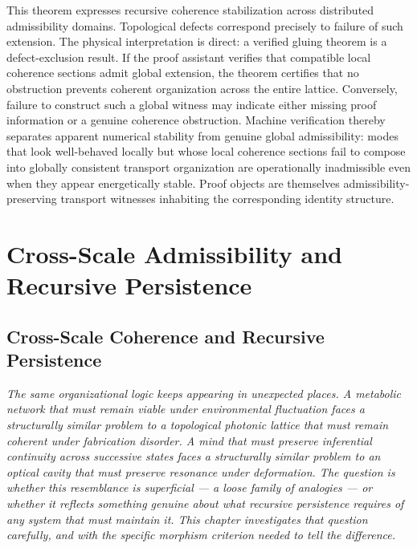\documentclass[11pt,openany]{book}
\theoremstyle{definition}
\theoremstyle{plain}
\begin{document}
This theorem expresses recursive coherence stabilization across distributed admissibility domains. Topological defects correspond precisely to failure of such extension. The physical interpretation is direct: a verified gluing theorem is a defect-exclusion result. If the proof assistant verifies that compatible local coherence sections admit global extension, the theorem certifies that no obstruction prevents coherent organization across the entire lattice. Conversely, failure to construct such a global witness may indicate either missing proof information or a genuine coherence obstruction. Machine verification thereby separates apparent numerical stability from genuine global admissibility: modes that look well-behaved locally but whose local coherence sections fail to compose into globally consistent transport organization are operationally inadmissible even when they appear energetically stable. Proof objects are themselves admissibility-preserving transport witnesses inhabiting the corresponding identity structure.


\part{Cross-Scale Admissibility and Recursive Persistence}


\chapter{Cross-Scale Coherence and Recursive Persistence}

\noindent\textit{The same organizational logic keeps appearing in unexpected places. A metabolic network that must remain viable under environmental fluctuation faces a structurally similar problem to a topological photonic lattice that must remain coherent under fabrication disorder. A mind that must preserve inferential continuity across successive states faces a structurally similar problem to an optical cavity that must preserve resonance under deformation. The question is whether this resemblance is superficial --- a loose family of analogies --- or whether it reflects something genuine about what recursive persistence requires of any system that must maintain it. This chapter investigates that question carefully, and with the specific morphism criterion needed to tell the difference.}
\end{document}

